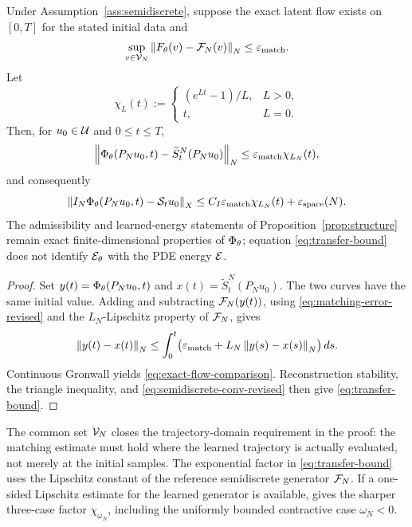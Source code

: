 \begin{theorem}\label{thm:transfer}
Under Assumption~\ref{ass:semidiscrete}, suppose the exact latent flow exists on $[0,T]$ for the stated initial data and
\begin{equation}\label{eq:matching-error-revised}
\sup_{v\in\mathcal{V}_N}\left\lVert F_\theta(v)-\mathcal{F}_N(v) \right\rVert_N
\le\varepsilon_{\mathrm{match}}.
\end{equation}
Let
\begin{equation*}
\chi_L(t):=
\begin{cases}(e^{Lt}-1)/L,&L>0,\\ t,&L=0.\end{cases}
\end{equation*}
Then, for $u_0\in\mathcal{U}$ and $0\le t\le T$,
\begin{equation}\label{eq:exact-flow-comparison}
\left\lVert \Phi_{\theta}(P_Nu_0,t)-\widetilde S_t^N(P_Nu_0) \right\rVert_N
\le \varepsilon_{\mathrm{match}}\chi_{L_N}(t),
\end{equation}
and consequently
\begin{equation}\label{eq:transfer-bound}
\left\lVert I_N\Phi_{\theta}(P_Nu_0,t)-\mathcal{S}_tu_0 \right\rVert_X
\le C_I\varepsilon_{\mathrm{match}}\chi_{L_N}(t)
+\varepsilon_{\mathrm{space}}(N).
\end{equation}
The admissibility and learned-energy statements of Proposition~\ref{prop:structure} remain exact finite-dimensional properties of $\Phi_{\theta}$; equation \eqref{eq:transfer-bound} does not identify $\mathcal{E}_\theta$ with the PDE energy $\mathcal{E}$.
\end{theorem}

\begin{proof}
Set $y(t)=\Phi_{\theta}(P_Nu_0,t)$ and $x(t)=\widetilde S_t^N(P_Nu_0)$. The two curves have the same initial value. Adding and subtracting $\mathcal{F}_N(y(t))$, using \eqref{eq:matching-error-revised} and the $L_N$-Lipschitz property of $\mathcal{F}_N$, gives
\begin{equation*}
\left\lVert y(t)-x(t) \right\rVert_N
\le\int_0^t\bigl(\varepsilon_{\mathrm{match}}+L_N\left\lVert y(s)-x(s) \right\rVert_N\bigr)\,ds.
\end{equation*}
Continuous Gronwall yields \eqref{eq:exact-flow-comparison}. Reconstruction stability, the triangle inequality, and \eqref{eq:semidiscrete-conv-revised} then give \eqref{eq:transfer-bound}.
\end{proof}

\begin{remark}\label{rem:transfer-common-set}
The common set $\mathcal{V}_N$ closes the trajectory-domain requirement in the proof: the matching estimate must hold where the learned trajectory is actually evaluated, not merely at the initial samples.  The exponential factor in \eqref{eq:transfer-bound} uses the Lipschitz constant of the reference semidiscrete generator $\mathcal{F}_N$.  If a one-sided Lipschitz estimate for the learned generator is available,  gives the sharper three-case factor $\chi_{\omega_N}$, including the uniformly bounded contractive case $\omega_N<0$.
\end{remark}

